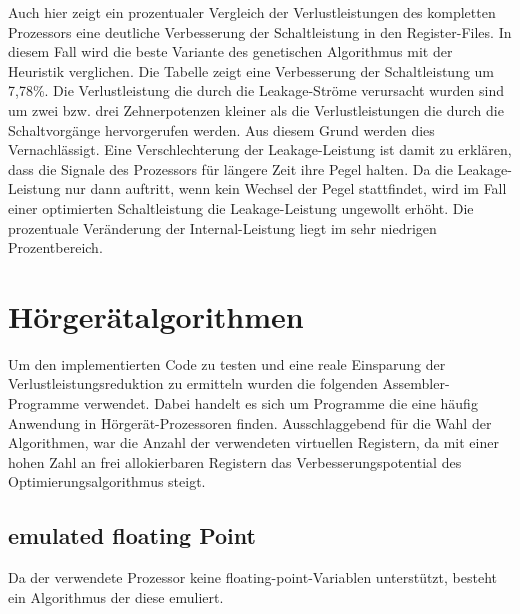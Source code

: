 %

Auch hier zeigt ein prozentualer Vergleich der Verlustleistungen des kompletten Prozessors eine deutliche Verbesserung der Schaltleistung in den Register-Files. In diesem Fall wird die beste Variante des genetischen Algorithmus mit der Heuristik verglichen. Die Tabelle zeigt eine Verbesserung der Schaltleistung um 7,78\%. Die Verlustleistung die durch die Leakage-Ströme verursacht wurden sind um zwei bzw. drei Zehnerpotenzen kleiner als die Verlustleistungen die durch die Schaltvorgänge hervorgerufen werden. Aus diesem Grund werden dies Vernachlässigt. Eine Verschlechterung der Leakage-Leistung ist damit zu erklären, dass die Signale des Prozessors für längere Zeit ihre Pegel halten. Da die Leakage-Leistung nur dann auftritt, wenn kein Wechsel der Pegel stattfindet, wird im Fall einer optimierten Schaltleistung die Leakage-Leistung ungewollt erhöht.
Die prozentuale Veränderung der Internal-Leistung liegt im sehr niedrigen Prozentbereich. 




\section{Hörgerätalgorithmen}
\label{sec:testprogamme}
Um den implementierten Code zu testen und eine reale Einsparung der Verlustleistungsreduktion zu ermitteln wurden die folgenden Assembler-Programme verwendet. Dabei handelt es sich um Programme die eine häufig Anwendung in Hörgerät-Prozessoren finden. Ausschlaggebend für die Wahl der Algorithmen, war die Anzahl der verwendeten virtuellen Registern, da mit einer hohen Zahl an frei allokierbaren Registern das Verbesserungspotential des Optimierungsalgorithmus steigt.
\subsection{emulated floating Point}
Da der verwendete Prozessor keine floating-point-Variablen unterstützt, besteht ein Algorithmus der diese emuliert.

